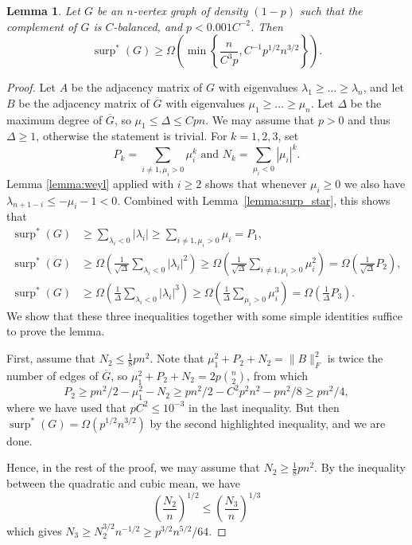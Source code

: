 \documentclass[11pt]{article}
\theoremstyle{plain}
\newtheorem{lemma}[theorem]{Lemma}
\theoremstyle{definition}
\DeclareMathOperator{\surp}{surp}
\begin{document}
\begin{lemma}\label{lemma:main_very_dense}
Let $G$ be an $n$-vertex graph of density $(1-p)$ such that the complement of $G$ is $C$-balanced, and $p<0.001C^{-2}$. Then 
$$\surp^*(G)\geq \Omega\left(\min\left\{\frac{n}{C^3p},C^{-1}p^{1/2}n^{3/2}\right\}\right).$$ 
\end{lemma}

\begin{proof}
Let $A$ be the adjacency matrix of $G$ with eigenvalues $\lambda_1\geq \dots\geq \lambda_n$, and let $B$ be the adjacency matrix of $\overline{G}$ with eigenvalues $\mu_1\geq\dots\geq \mu_n$. Let $\Delta$ be the maximum degree of $\overline{G}$, so $\mu_1\leq \Delta\leq Cpn$. We may assume that $p>0$ and thus $\Delta\geq 1$, otherwise the statement is trivial. For $k=1,2,3$, set $$P_k=\sum_{i\neq 1, \mu_i>0}\mu_i^k\mbox{\ \ \ and\ \ \ } N_k=\sum_{\mu_i<0}|\mu_i|^k.$$ Lemma \ref{lemma:weyl} applied with $i\geq 2$ shows that whenever $\mu_i\geq 0$ we also have $\lambda_{n+1-i}\leq -\mu_i-1<0$. Combined with Lemma~\ref{lemma:surp_star}, this shows that
\begin{align*}
\surp^*(G)&\geq \sum_{\lambda_i<0}|\lambda_i|\geq \sum_{i\neq 1, \mu_i>0}\mu_i = P_1,\\
 \surp^*(G)&\geq \Omega\left(\frac{1}{\sqrt{\Delta}}\sum_{\lambda_i<0}|\lambda_i|^2\right)\geq\Omega\left(\frac{1}{\sqrt{\Delta}}\sum_{i\neq 1, \mu_i>0}\mu_i^2\right) = \Omega\left(\frac{1}{\sqrt{\Delta}}P_2\right),\\
\surp^*(G)&\geq \Omega\left(\frac{1}{\Delta}\sum_{\lambda_i<0}|\lambda_i|^3\right)\geq \Omega\left(\frac{1}{\Delta}\sum_{\mu_i>0}\mu_i^3\right)= \Omega\left(\frac{1}{\Delta}P_3\right).
\end{align*}
We show that these three inequalities together with some simple identities suffice to prove the lemma. 

First, assume that $N_2\leq \frac{1}{8}pn^2$. Note that $\mu_1^2+P_2+N_2=\|B\|_F^2$ is twice the number of edges of $\overline{G}$, so $\mu_1^2+P_2+N_2=2p\binom{n}{2}$, from which
$$P_2\geq pn^2/2-\mu_1^2-N_2\geq pn^2/2-C^2p^2n^2-pn^2/8\geq pn^2/4,$$
where we have used that $pC^2\leq 10^{-3}$ in the last inequality. But then $\surp^*(G)=\Omega(p^{1/2}n^{3/2})$ by the second highlighted inequality, and we are done.

Hence, in the rest of the proof, we may assume that $N_2\geq \frac{1}{8}pn^2$. By the inequality between the quadratic and cubic mean, we have
$$\left(\frac{N_2}{n}\right)^{1/2}\leq \left(\frac{N_3}{n}\right)^{1/3}$$
which gives $N_3\geq N_2^{3/2}n^{-1/2}\geq p^{3/2}n^{5/2}/64.$


\end{proof}
\end{document}
